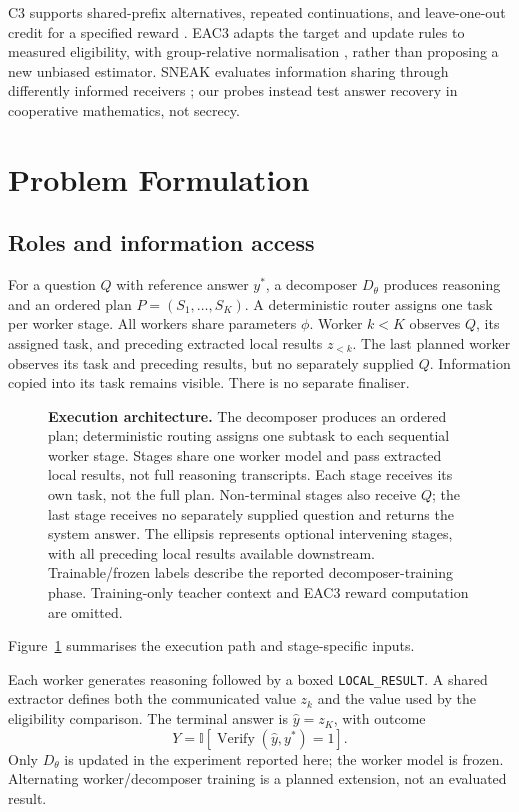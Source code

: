 \documentclass[11pt]{article}
\newcommand{\ind}{\mathbb{I}}
\begin{document}
C3 supports shared-prefix alternatives, repeated continuations, and leave-one-out credit for a specified reward \citep{chen2026c3}. EAC3 adapts the target and update rules to measured eligibility, with group-relative normalisation \citep{shao2024deepseekmath}, rather than proposing a new unbiased estimator. SNEAK evaluates information sharing through differently informed receivers \citep{avsian2026sneak}; our probes instead test answer recovery in cooperative mathematics, not secrecy.

\section{Problem Formulation}
\subsection{Roles and information access}
For a question $Q$ with reference answer $y^*$, a decomposer $D_\theta$ produces reasoning and an ordered plan $P=(S_1,\ldots,S_K)$. A deterministic router assigns one task per worker stage. All workers share parameters $\phi$. Worker $k<K$ observes $Q$, its assigned task, and preceding extracted local results $z_{<k}$. The last planned worker observes its task and preceding results, but no separately supplied $Q$. Information copied into its task remains visible. There is no separate finaliser.

\begin{figure}[t]
\centering
\resizebox{\textwidth}{!}{}
\caption{\textbf{Execution architecture.} The decomposer produces an ordered plan; deterministic routing assigns one subtask to each sequential worker stage. Stages share one worker model and pass extracted local results, not full reasoning transcripts. Each stage receives its own task, not the full plan. Non-terminal stages also receive $Q$; the last stage receives no separately supplied question and returns the system answer. The ellipsis represents optional intervening stages, with all preceding local results available downstream. Trainable/frozen labels describe the reported decomposer-training phase. Training-only teacher context and EAC3 reward computation are omitted.}
\label{fig:architecture}
\end{figure}

Figure~\ref{fig:architecture} summarises the execution path and stage-specific inputs.

Each worker generates reasoning followed by a boxed \texttt{LOCAL\_RESULT}. A shared extractor defines both the communicated value $z_k$ and the value used by the eligibility comparison. The terminal answer is $\hat y=z_K$, with outcome
\begin{equation}
Y=\ind[\operatorname{Verify}(\hat y,y^*)=1].
\end{equation}
Only $D_\theta$ is updated in the experiment reported here; the worker model is frozen. Alternating worker/decomposer training is a planned extension, not an evaluated result.
\end{document}
